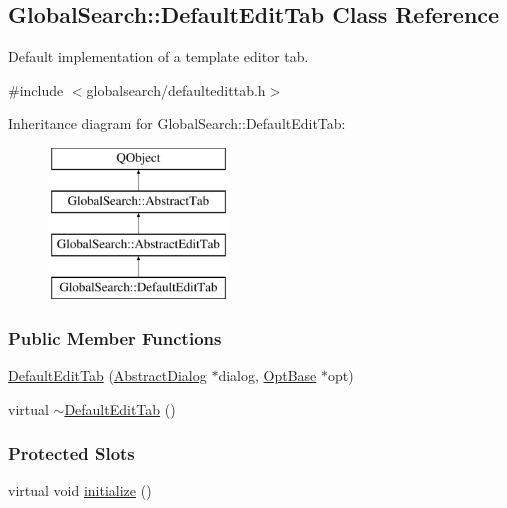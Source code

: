 \hypertarget{classGlobalSearch_1_1DefaultEditTab}{}\subsection{Global\+Search\+:\+:Default\+Edit\+Tab Class Reference}
\label{classGlobalSearch_1_1DefaultEditTab}


Default implementation of a template editor tab.  




{\ttfamily \#include $<$globalsearch/defaultedittab.\+h$>$}

Inheritance diagram for Global\+Search\+:\+:Default\+Edit\+Tab\+:\begin{figure}[H]
\begin{center}
\leavevmode
\includegraphics[height=4.000000cm]{classGlobalSearch_1_1DefaultEditTab}
\end{center}
\end{figure}
\subsubsection*{Public Member Functions}
\begin{DoxyCompactItemize}
\item 
\hyperlink{classGlobalSearch_1_1DefaultEditTab_ae511483de60e194bcf2e82e931da541d}{Default\+Edit\+Tab} (\hyperlink{classGlobalSearch_1_1AbstractDialog}{Abstract\+Dialog} $\ast$dialog, \hyperlink{classGlobalSearch_1_1OptBase}{Opt\+Base} $\ast$opt)
\item 
virtual \hyperlink{classGlobalSearch_1_1DefaultEditTab_ab2b458010ec73753f0e00b568af00d0b}{$\sim$\+Default\+Edit\+Tab} ()
\end{DoxyCompactItemize}
\subsubsection*{Protected Slots}
\begin{DoxyCompactItemize}
\item 
virtual void \hyperlink{classGlobalSearch_1_1DefaultEditTab_aabb8111d57852154b366640b728baabb}{initialize} ()
\end{DoxyCompactItemize}

